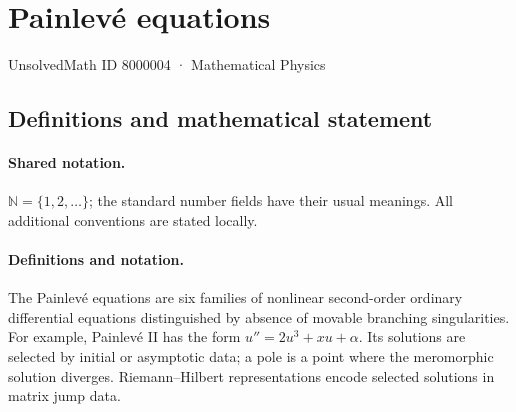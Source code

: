 \documentclass[11pt]{article}
\begin{document}
\setcounter{section}{8000003}
\section{Painlev\'e equations}\label{8000004}
{\small UnsolvedMath ID 8000004 · Mathematical Physics}
\subsection{Definitions and mathematical statement}

\paragraph{Shared notation.}$\mathbb N=\{1,2,\ldots\}$; the standard number fields have their usual meanings. All additional conventions are stated locally.


\paragraph{Definitions and notation.}The Painlevé equations are six families of nonlinear second-order ordinary differential equations distinguished by absence of movable branching singularities. For example, Painlevé II has the form $u''=2u^3+xu+\alpha$. Its solutions are selected by initial or asymptotic data; a pole is a point where the meromorphic solution diverges. Riemann--Hilbert representations encode selected solutions in matrix jump data.
\end{document}
